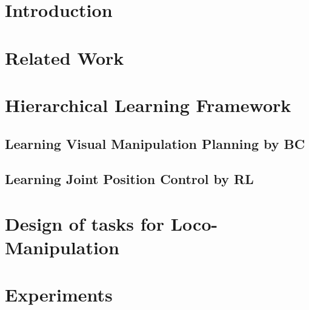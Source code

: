\documentclass[letterpaper, 10 pt, conference]{ieeeconf}  %
\begin{document}
\section{Introduction}

\label{sec:Introduction}

\section{Related Work}

% 

\section{Hierarchical Learning Framework}


\subsection{Learning Visual Manipulation Planning by BC}


\subsection{Learning Joint Position Control by RL}


\section{Design of tasks for Loco-Manipulation}

\section{Experiments}

\end{document}
